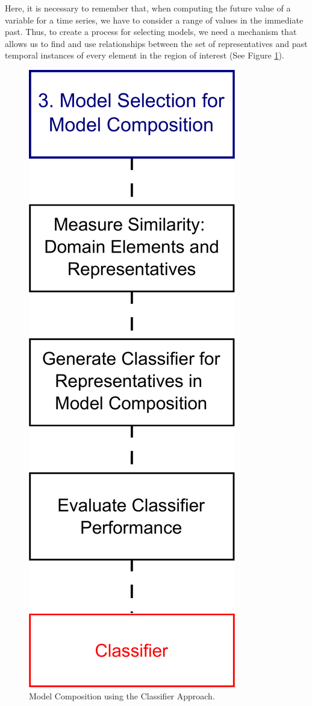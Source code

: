 Here, it is necessary to remember that, when computing the future value of a variable for a time series, we have to consider a range of values in the immediate past\cite{Chatfield2001}. Thus, to create a process for selecting models, we need a mechanism that allows us to find and use relationships between the set of representatives and past temporal instances of every element in the region of interest (See Figure \ref{Fig:model_composition_classifier_diagram}).

\begin{figure}[h]
	\centering
	\includegraphics[scale=0.15]{../Figures/Experiments_Methodology_Step3}
	\caption{Model Composition using the Classifier Approach.}
	\label{Fig:model_composition_classifier_diagram}
\end{figure}

